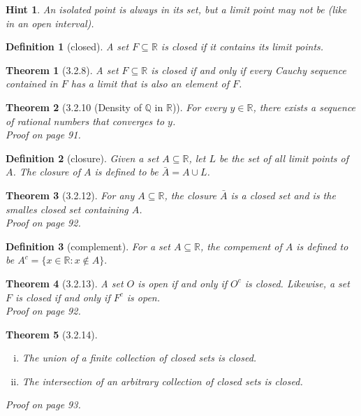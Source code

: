 \documentclass{article}
\newtheorem{definition}{Definition}
\newtheorem{thm}{Theorem}
\newtheorem{hint}{Hint}
\begin{document}
\begin{hint}
    An isolated point is always in its set, but a limit point may not be (like in an open interval).
\end{hint}

\begin{definition}[closed]
    A set $F \subseteq \mathbb{R}$ is closed if it contains its limit points.
\end{definition}

\begin{thm}[3.2.8]
    A set $F \subseteq \mathbb{R}$ is closed if and only if every Cauchy sequence contained in $F$ has a limit that is also an element of $F$.
\end{thm}

\begin{thm}[3.2.10 (Density of $\mathbb{Q}$ in $\mathbb{R}$)]
    For every $y \in \mathbb{R}$, there exists a sequence of rational numbers that converges to $y$. \\ Proof on page 91.
\end{thm}

\begin{definition}[closure]
    Given a set $A \subseteq \mathbb{R}$, let $L$ be the set of all limit points of $A$. The closure of $A$ is defined to be $\bar{A} = A\cup L$.
\end{definition}

\begin{thm}[3.2.12]
    For any $A \subseteq \mathbb{R}$, the closure $\bar{A}$ is a closed set and is the smalles closed set containing $A$. \\ Proof on page 92.
\end{thm}

\begin{definition}[complement]
    For a set $A \subseteq \mathbb{R}$, the compement of $A$ is defined to be $A^c = \{x \in \mathbb{R} : x \notin A\}.$
\end{definition}

\begin{thm}[3.2.13]
    A set $O$ is open if and only if $O^c$ is closed. Likewise, a set $F$ is closed if and only if $F^c$ is open. \\ Proof on page 92.
\end{thm}

\begin{thm}[3.2.14]
    \begin{enumerate}[(i)]
        \item The union of a finite collection of closed sets is closed.
        \item The intersection of an arbitrary collection of closed sets is closed.
    \end{enumerate}
    Proof on page 93.
\end{thm}
\end{document}
